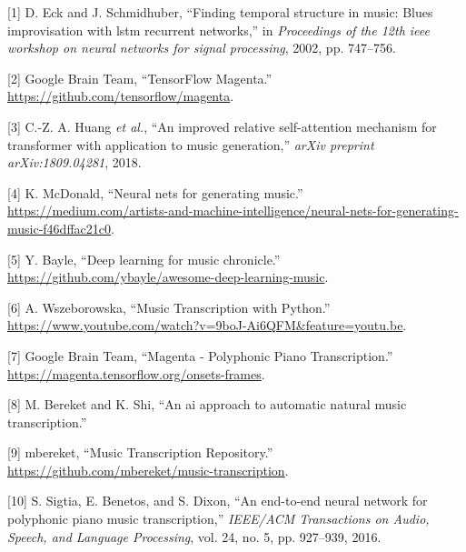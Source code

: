 \documentclass[12pt,]{article}
\begin{document}
\hypertarget{refs}{}
\leavevmode\hypertarget{ref-eck2002finding}{}%
{[}1{]} D. Eck and J. Schmidhuber, ``Finding temporal structure in
music: Blues improvisation with lstm recurrent networks,'' in
\emph{Proceedings of the 12th ieee workshop on neural networks for
signal processing}, 2002, pp. 747--756.

\leavevmode\hypertarget{ref-magenta}{}%
{[}2{]} \relax Google Brain Team, ``TensorFlow Magenta.'' \\
\url{https://github.com/tensorflow/magenta}.

\leavevmode\hypertarget{ref-huang2018improved}{}%
{[}3{]} C.-Z. A. Huang \emph{et al.}, ``An improved relative
self-attention mechanism for transformer with application to music
generation,'' \emph{arXiv preprint arXiv:1809.04281}, 2018.

\leavevmode\hypertarget{ref-mediumkylemcdonald}{}%
{[}4{]} K. McDonald, ``Neural nets for generating music.'' \\
\url{https://medium.com/artists-and-machine-intelligence/neural-nets-for-generating-music-f46dffac21c0}.

\leavevmode\hypertarget{ref-libdlmusic}{}%
{[}5{]} Y. Bayle, ``Deep learning for music chronicle.'' \\
\url{https://github.com/ybayle/awesome-deep-learning-music}.

\leavevmode\hypertarget{ref-annaw}{}%
{[}6{]} A. Wszeborowska, ``Music Transcription with Python.'' \\
\url{https://www.youtube.com/watch?v=9boJ-Ai6QFM\&feature=youtu.be}.

\leavevmode\hypertarget{ref-magentaonsetframes}{}%
{[}7{]} \relax Google Brain Team, ``Magenta - Polyphonic Piano
Transcription.'' \\
\url{https://magenta.tensorflow.org/onsets-frames}.

\leavevmode\hypertarget{ref-bereketai}{}%
{[}8{]} M. Bereket and K. Shi, ``An ai approach to automatic natural
music transcription.''

\leavevmode\hypertarget{ref-mbereket}{}%
{[}9{]} \relax mbereket, ``Music Transcription Repository.'' \\
\url{https://github.com/mbereket/music-transcription}.

\leavevmode\hypertarget{ref-sigtia2016end}{}%
{[}10{]} S. Sigtia, E. Benetos, and S. Dixon, ``An end-to-end neural
network for polyphonic piano music transcription,'' \emph{IEEE/ACM
Transactions on Audio, Speech, and Language Processing}, vol. 24, no. 5,
pp. 927--939, 2016.
\end{document}

